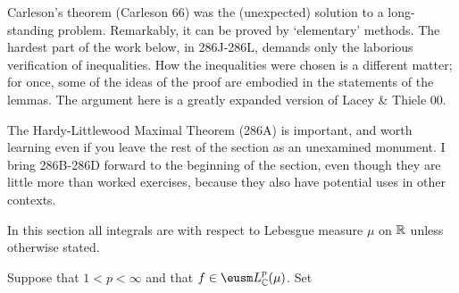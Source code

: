 \newdimen\sparewidth

\def\chaptername{Fourier analysis}
\def\sectionname{Carleson's theorem}

\def\energy{\mathop{\text{energy}}\nolimits}
\def\Innerprod#1#2{\bigl(#1\bigr|#2\bigr)}
\def\mass{\mathop{\text{mass}}\nolimits}
\def\recheck{\discrversionA{\immediate\write0{query}
    \global\advance\footnotenumber by 1
    \oldfootnote{$^{\the\footnotenumber}$}{recheck}}{}}
\def\vartildef{\tilde{\hbox{$f$}}}



Carleson's theorem ({\smc Carleson 66}) was the (unexpected)
solution to
a long-standing problem.   Remarkably, it can be proved by `elementary'
methods.   The hardest part of the work below, in 286J-286L, demands
only the laborious verification of inequalities.   How the inequalities
were chosen is a different matter;  for once, some of the ideas of
the proof are embodied in the statements of the lemmas.   The argument here is a
greatly expanded version of {\smc Lacey \& Thiele 00}.

The Hardy-Littlewood Maximal Theorem (286A) is important, and worth
learning even if you
leave the rest of the section as an unexamined monument.   I bring
286B-286D %
forward to the beginning of the section, even though they are little
more than worked exercises, because they also have potential uses in
other contexts.



In this section all integrals are with respect to Lebesgue measure $\mu$
on $\Bbb R$ unless otherwise stated.

Suppose that $1<p<\infty$ and that
$f\in\eusm L_{\Bbb C}^p(\mu)$.   Set

